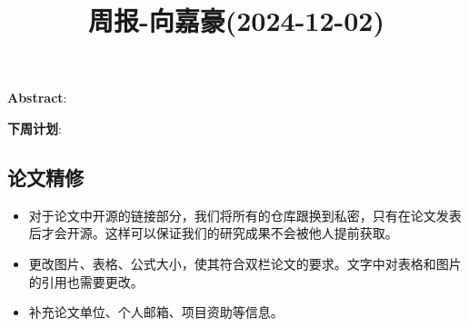 \documentclass[11pt,a4paper]{article}
\title{周报-向嘉豪(2024-12-02)}
\renewcommand{\maketitle}{
  \begin{center}
    \LARGE\bfseries\thetitle
  \end{center}
}
\begin{document}
\maketitle


\noindent \textbf{Abstract}: 

\noindent \textbf{下周计划}: 

\subsection{论文精修}

\begin{itemize}
  \item 对于论文中开源的链接部分，我们将所有的仓库跟换到私密，只有在论文发表后才会开源。这样可以保证我们的研究成果不会被他人提前获取。
  \item 更改图片、表格、公式大小，使其符合双栏论文的要求。文字中对表格和图片的引用也需要更改。
  \item 补充论文单位、个人邮箱、项目资助等信息。
\end{itemize}






% 
% 
\end{document}
